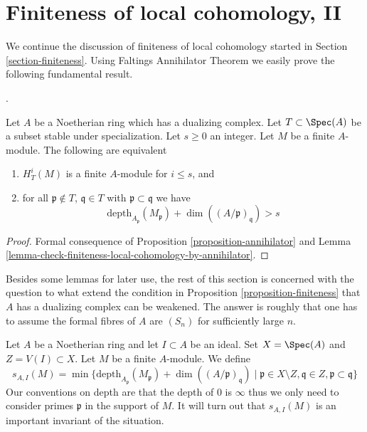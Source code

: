 \section{Finiteness of local cohomology, II}
\label{section-finiteness-II}

\noindent
We continue the discussion of finiteness of local cohomology started in
Section \ref{section-finiteness}. Using
Faltings Annihilator Theorem
we easily prove the following fundamental result.

\begin{proposition}
\label{proposition-finiteness}
\begin{reference}
\cite{Faltings-annulators}.
\end{reference}
Let $A$ be a Noetherian ring which has a dualizing complex.
Let $T \subset \Spec(A)$ be a subset stable under specialization.
Let $s \geq 0$ an integer. Let $M$ be a finite $A$-module.
The following are equivalent
\begin{enumerate}
\item $H^i_T(M)$ is a finite $A$-module for $i \leq s$, and
\item for all $\mathfrak p \not \in T$, $\mathfrak q \in T$ with
$\mathfrak p \subset \mathfrak q$ we have
$$
\text{depth}_{A_\mathfrak p}(M_\mathfrak p) +
\dim((A/\mathfrak p)_\mathfrak q) > s
$$
\end{enumerate}
\end{proposition}

\begin{proof}
Formal consequence of Proposition \ref{proposition-annihilator} and
Lemma \ref{lemma-check-finiteness-local-cohomology-by-annihilator}.
\end{proof}

\noindent
Besides some lemmas for later use, the rest of this section is
concerned with the question to what extend the condition in
Proposition \ref{proposition-finiteness}
that $A$ has a dualizing complex can be weakened. The answer is roughly
that one has to assume the formal fibres of $A$ are $(S_n)$
for sufficiently large $n$.

\medskip\noindent
Let $A$ be a Noetherian ring and let $I \subset A$ be an ideal.
Set $X = \Spec(A)$ and $Z = V(I) \subset X$. Let $M$ be a finite $A$-module.
We define
\begin{equation}
\label{equation-cutoff}
s_{A, I}(M) =
\min \{
\text{depth}_{A_\mathfrak p}(M_\mathfrak p) + \dim((A/\mathfrak p)_\mathfrak q)
\mid
\mathfrak p \in X \setminus Z, \mathfrak q \in Z,
\mathfrak p \subset \mathfrak q
\}
\end{equation}
Our conventions on depth are that the depth of $0$ is $\infty$
thus we only need to consider primes $\mathfrak p$ in the support
of $M$. It will turn out that $s_{A, I}(M)$ is an important invariant of
the situation.


